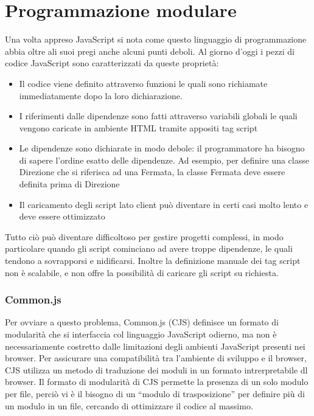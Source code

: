 \section{Programmazione modulare} %
\label{sec:programmazione_modulare}

Una volta appreso JavaScript si nota come questo linguaggio di programmazione abbia oltre ali suoi pregi anche alcuni punti deboli.
Al giorno d'oggi i pezzi di codice JavaScript sono caratterizzati da queste proprietà: 
\begin{itemize}
    \item Il codice viene definito attraverso funzioni le quali sono richiamate immediatamente dopo la loro dichiarazione.
    \item I riferimenti dalle dipendenze sono fatti attraverso variabili globali le quali vengono caricate in ambiente HTML tramite appositi tag script
    \item Le dipendenze sono dichiarate in modo debole: il programmatore ha bisogno di sapere l'ordine esatto delle dipendenze. Ad esempio, per definire una classe Direzione che si riferisca ad una Fermata, la classe Fermata deve essere definita prima di Direzione
    \item Il caricamento degli script lato client può diventare in certi casi molto lento e deve essere ottimizzato
\end{itemize}

Tutto ciò può diventare difficoltoso per gestire progetti complessi, in modo particolare quando gli script cominciano ad avere troppe dipendenze, le quali tendono a sovrapporsi e nidificarsi. Inoltre la definizione manuale dei tag script non è scalabile, e non offre la possibilità di caricare gli script su richiesta.

\subsubsection{Common.js} %
\label{ssub:common_js}
Per ovviare a questo problema, Common.js (CJS) definisce un formato di modularità che si interfaccia col linguaggio JavaScript odierno, ma non è necessariamente costretto dalle limitazioni degli ambienti JavaScript presenti nei browser. Per assicurare una compatibilità tra l'ambiente di sviluppo e il browser, CJS utilizza un metodo di traduzione dei moduli in un formato intrerpretabile dl browser. Il formato di modularità di CJS permette la presenza di un solo modulo per file, perciò vi è il bisogno di un ``modulo di trasposizione'' per definire più di un modulo in un file, cercando di ottimizzare il codice al massimo.

